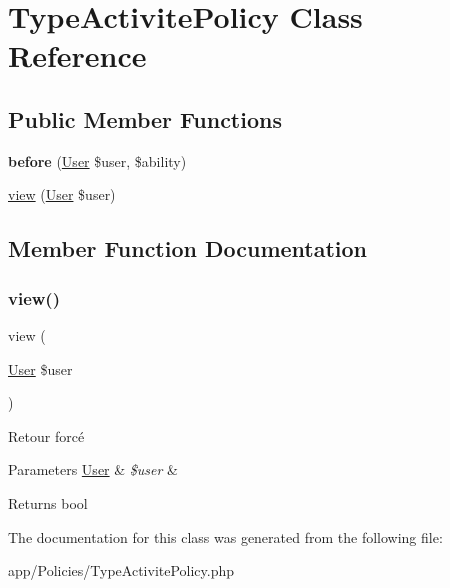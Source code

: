 \hypertarget{class_app_1_1_policies_1_1_type_activite_policy}{}\section{Type\+Activite\+Policy Class Reference}
\label{class_app_1_1_policies_1_1_type_activite_policy}
\subsection*{Public Member Functions}
\begin{DoxyCompactItemize}
\item 
\mbox{\label{class_app_1_1_policies_1_1_type_activite_policy_ae8e148ffcb5929131f9bbef4a09bda35}} 
{\bfseries before} (\mbox{\hyperlink{class_app_1_1_user}{User}} \$user, \$ability)
\item 
\mbox{\hyperlink{class_app_1_1_policies_1_1_type_activite_policy_a7d2bfa2eab20cb1de3a321632440c315}{view}} (\mbox{\hyperlink{class_app_1_1_user}{User}} \$user)
\end{DoxyCompactItemize}


\subsection{Member Function Documentation}
\mbox{\label{class_app_1_1_policies_1_1_type_activite_policy_a7d2bfa2eab20cb1de3a321632440c315}} 
\subsubsection{\texorpdfstring{view()}{view()}}
{\footnotesize\ttfamily view (\begin{DoxyParamCaption}\item[{\mbox{\hyperlink{class_app_1_1_user}{User}}}]{\$user }\end{DoxyParamCaption})}

Retour forcé 
\begin{DoxyParams}[1]{Parameters}
\mbox{\hyperlink{class_app_1_1_user}{User}} & {\em \$user} & \\
\hline
\end{DoxyParams}
\begin{DoxyReturn}{Returns}
bool 
\end{DoxyReturn}


The documentation for this class was generated from the following file\+:\begin{DoxyCompactItemize}
\item 
app/\+Policies/Type\+Activite\+Policy.\+php\end{DoxyCompactItemize}

